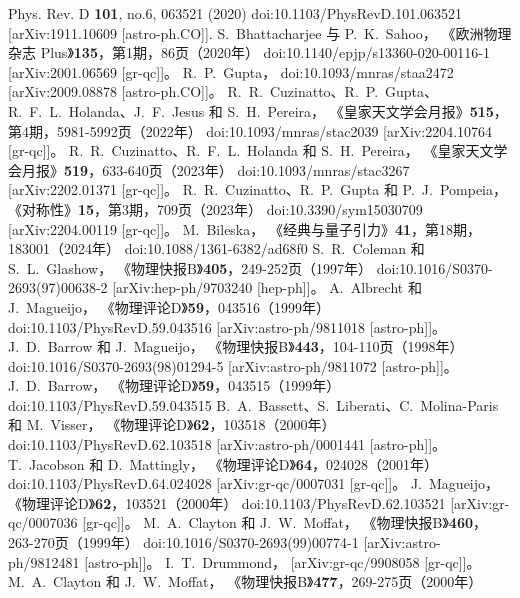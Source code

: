 \documentclass[jkps,preprint,fleqn]{revtex4}
\begin{document}
\begin{CJK*}{UTF8}{gbsn}
\begin{thebibliography}{999}
Phys. Rev. D \textbf{101}, no.6, 063521 (2020)
doi:10.1103/PhysRevD.101.063521
[arXiv:1911.10609 [astro-ph.CO]].
S.~Bhattacharjee 与 P.~K.~Sahoo，
《欧洲物理杂志 Plus》\textbf{135}，第1期，86页（2020年）
doi:10.1140/epjp/s13360-020-00116-1
[arXiv:2001.06569 [gr-qc]]。
R.~P.~Gupta，
doi:10.1093/mnras/staa2472
[arXiv:2009.08878 [astro-ph.CO]]。
R.~R.~Cuzinatto、R.~P.~Gupta、R.~F.~L.~Holanda、J.~F.~Jesus 和 S.~H.~Pereira，
《皇家天文学会月报》\textbf{515}，第4期，5981-5992页（2022年）
doi:10.1093/mnras/stac2039
[arXiv:2204.10764 [gr-qc]]。
R.~R.~Cuzinatto、R.~F.~L.~Holanda 和 S.~H.~Pereira，
《皇家天文学会月报》\textbf{519}，633-640页（2023年）
doi:10.1093/mnras/stac3267
[arXiv:2202.01371 [gr-qc]]。
R.~R.~Cuzinatto、R.~P.~Gupta 和 P.~J.~Pompeia，
《对称性》\textbf{15}，第3期，709页（2023年）
doi:10.3390/sym15030709
[arXiv:2204.00119 [gr-qc]]。
M.~Bileska，
《经典与量子引力》\textbf{41}，第18期，183001（2024年）
doi:10.1088/1361-6382/ad68f0
S.~R.~Coleman 和 S.~L.~Glashow，
《物理快报B》\textbf{405}，249-252页（1997年）
doi:10.1016/S0370-2693(97)00638-2
[arXiv:hep-ph/9703240 [hep-ph]]。
A.~Albrecht 和 J.~Magueijo，
《物理评论D》\textbf{59}，043516（1999年）
doi:10.1103/PhysRevD.59.043516
[arXiv:astro-ph/9811018 [astro-ph]]。
J.~D.~Barrow 和 J.~Magueijo，
《物理快报B》\textbf{443}，104-110页（1998年）
doi:10.1016/S0370-2693(98)01294-5
[arXiv:astro-ph/9811072 [astro-ph]]。
J.~D.~Barrow，
《物理评论D》\textbf{59}，043515（1999年）
doi:10.1103/PhysRevD.59.043515
B.~A.~Bassett、S.~Liberati、C.~Molina-Paris 和 M.~Visser，
《物理评论D》\textbf{62}，103518（2000年）
doi:10.1103/PhysRevD.62.103518
[arXiv:astro-ph/0001441 [astro-ph]]。
T.~Jacobson 和 D.~Mattingly，
《物理评论D》\textbf{64}，024028（2001年）
doi:10.1103/PhysRevD.64.024028
[arXiv:gr-qc/0007031 [gr-qc]]。
J.~Magueijo，
《物理评论D》\textbf{62}，103521（2000年）
doi:10.1103/PhysRevD.62.103521
[arXiv:gr-qc/0007036 [gr-qc]]。
M.~A.~Clayton 和 J.~W.~Moffat，
《物理快报B》\textbf{460}，263-270页（1999年）
doi:10.1016/S0370-2693(99)00774-1
[arXiv:astro-ph/9812481 [astro-ph]]。
I.~T.~Drummond，
[arXiv:gr-qc/9908058 [gr-qc]]。
M.~A.~Clayton 和 J.~W.~Moffat，
《物理快报B》\textbf{477}，269-275页（2000年）

\end{thebibliography}
\end{CJK*}
\end{document}
